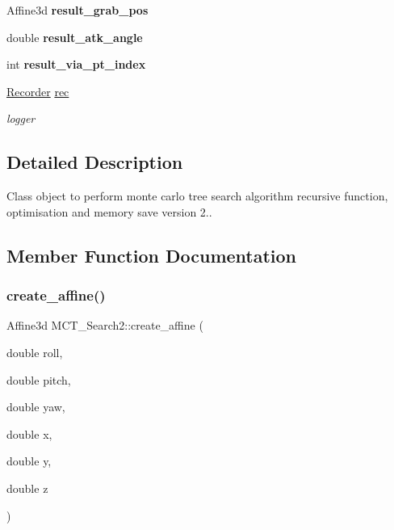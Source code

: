 \begin{DoxyCompactItemize}
Affine3d {\bfseries result\+\_\+grab\+\_\+pos}
\item 
\mbox{\label{classMCT__Search2_a9b29cb64bd967d71b0ef4a56d473a0cb}} 
double {\bfseries result\+\_\+atk\+\_\+angle}
\item 
\mbox{\label{classMCT__Search2_a3c6905ec9d8bddb1e1055cd01d11286f}} 
int {\bfseries result\+\_\+via\+\_\+pt\+\_\+index}
\item 
\mbox{\label{classMCT__Search2_a93ad76aeefbab8848287f334e1494c46}} 
\hyperlink{classRecorder}{Recorder} \hyperlink{classMCT__Search2_a93ad76aeefbab8848287f334e1494c46}{rec}
\begin{DoxyCompactList}\small\item\em logger \end{DoxyCompactList}\end{DoxyCompactItemize}


\subsection{Detailed Description}
Class object to perform monte carlo tree search algorithm recursive function, optimisation and memory save version 2.. 

\subsection{Member Function Documentation}
\mbox{\label{classMCT__Search2_afabc664bbcbb6694a66c5a0b78bc0f68}} 
\subsubsection{\texorpdfstring{create\+\_\+affine()}{create\_affine()}}
{\footnotesize\ttfamily Affine3d M\+C\+T\+\_\+\+Search2\+::create\+\_\+affine (\begin{DoxyParamCaption}\item[{double}]{roll,  }\item[{double}]{pitch,  }\item[{double}]{yaw,  }\item[{double}]{x,  }\item[{double}]{y,  }\item[{double}]{z }\end{DoxyParamCaption})\hspace{0.3cm}{\ttfamily [private]}}



